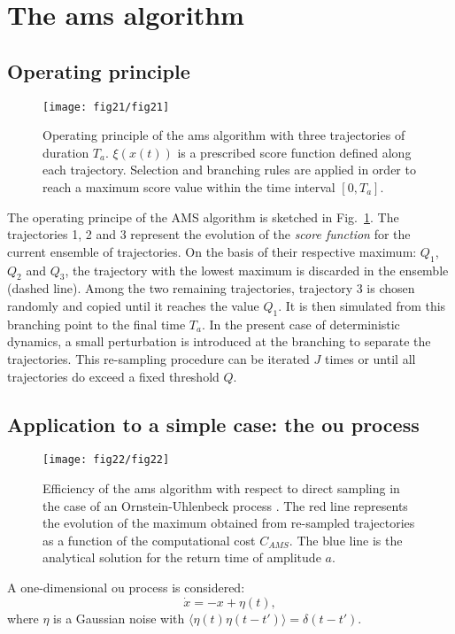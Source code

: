 \section{The \ac{ams} algorithm}
\label{app:ams-short}

\subsection{Operating principle}

\begin{figure}
	\centering
	\texttt{[image: fig21/fig21]}
	\caption{\label{fig:illustr_AMS} Operating principle of the \ac{ams} algorithm with three trajectories of duration $T_a$. $\xi(x(t))$ is a prescribed score function defined along each trajectory. 
	Selection and branching rules are applied in order to reach a maximum score value within the time interval $[0,T_a]$. }
\end{figure}


The operating principe of the AMS algorithm is sketched in Fig.~\ref{fig:illustr_AMS}.
%
The trajectories 1, 2 and 3 represent the evolution of the \emph{score function} for the current ensemble of trajectories. On the basis of their respective maximum: $Q_1$, $Q_2$ and $Q_3$, the trajectory with the lowest maximum is discarded in the ensemble (dashed line). Among the two remaining trajectories, trajectory 3 is chosen randomly and copied until it reaches the value $Q_1$. It is then simulated from this branching point to the final time $T_a$. In the present case of deterministic dynamics, a small perturbation is introduced at the branching to separate the trajectories. This re-sampling procedure can be iterated $J$ times or until all trajectories do exceed a fixed threshold $Q$.

\subsection{Application to a simple case: the \acl{ou} process}
	
	\begin{figure}
		\centering
		\texttt{[image: fig22/fig22]}
		\caption{Efficiency of the \ac{ams} algorithm with respect to direct sampling in the case of an Ornstein-Uhlenbeck process \citep{lestang_computing_2018}. The red line represents the evolution of the maximum obtained from re-sampled trajectories as a function of the computational cost $C_{AMS}$. The blue line is the analytical solution for the return time of amplitude $a$.}
		\label{fig:comparaison_temps_de_retour}
	\end{figure}
	A one-dimensional \acl{ou} process is considered:
	\begin{equation}
	\label{eq:ou}
	\dot{x} = -x + \eta (t),
	\end{equation}
	where $\eta$ is a Gaussian noise with $\langle \eta(t)\eta(t-t')\rangle = \delta(t-t')$.
	
